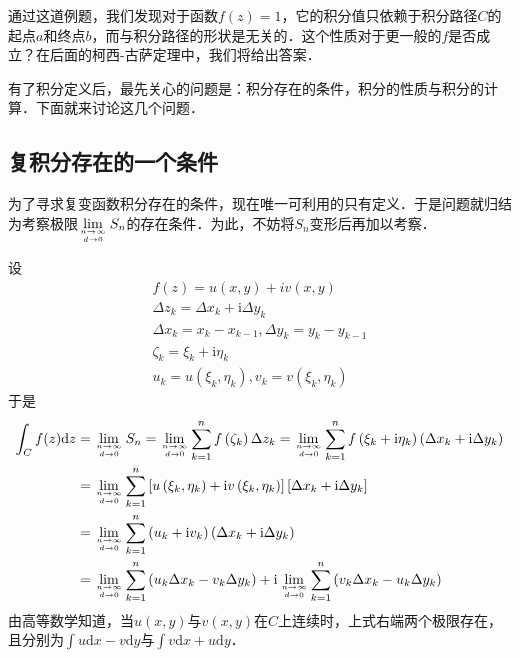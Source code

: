 通过这道例题，我们发现对于函数$f(z)=1$，它的积分值只依赖于积分路径$C$的起点$a$和终点$b$，而与积分路径的形状是无关的．这个性质对于更一般的$f$是否成立？在后面的柯西-古萨定理中，我们将给出答案．

有了积分定义后，最先关心的问题是：积分存在的条件，积分的性质与积分的计算．下面就来讨论这几个问题．

\subsection{复积分存在的一个条件}

为了寻求复变函数积分存在的条件，现在唯一可利用的只有定义．于是问题就归结为考察极限$\displaystyle \lim _{n \rightarrow \infty \atop d \rightarrow 0} S_{n}$的存在条件．为此，不妨将$S_n$变形后再加以考察．

设
\begin{equation}
\begin{array}{l}f(z)=u(x, y)+i v(x, y) \\ \Delta z_{k}=\Delta x_{k}+\mathrm{i} \Delta y_{k} \\ \Delta x_{k}=x_{k}-x_{k-1}, \Delta y_{k}=y_{k}-y_{k-1} \\ \zeta_{k}=\xi_{k}+\mathrm{i} \eta_{k} \\ u_{k}=u\left(\xi_{k}, \eta_{k}\right), v_{k}=v\left(\xi_{k}, \eta_{k}\right)\end{array}
\end{equation}
于是
\begin{equation}
\begin{aligned} \int_{C} f(z) \mathrm{d} z &=\lim _{n \rightarrow \infty \atop d \rightarrow 0} S_{n}=\lim _{n \rightarrow \infty \atop d \rightarrow 0} \sum_{k=1}^{n} f\left(\zeta_{k}\right) \Delta z_{k}=\lim _{n \rightarrow \infty \atop d \rightarrow 0} \sum_{k=1}^{n} f\left(\xi_{k}+\mathrm{i} \eta_{k}\right)\left(\Delta x_{k}+\mathrm{i} \Delta y_{k}\right) \\ &=\lim _{n \rightarrow \infty \atop d \rightarrow 0} \sum_{k=1}^{n}\left[u\left(\xi_{k}, \eta_{k}\right)+\mathrm{i} v\left(\xi_{k}, \eta_{k}\right)\right]\left[\Delta x_{k}+\mathrm{i} \Delta y_{k}\right] \\ &=\lim _{n \rightarrow \infty \atop d \rightarrow 0} \sum_{k=1}^{n}\left(u_{k}+\mathrm{i} v_{k}\right)\left(\Delta x_{k}+\mathrm{i} \Delta y_{k}\right) \\ &=\lim _{n \rightarrow \infty \atop d \rightarrow 0} \sum_{k=1}^{n}\left(u_{k} \Delta x_{k}-v_{k} \Delta y_{k}\right)+\mathrm{i} \lim _{n \rightarrow \infty \atop d \rightarrow 0} \sum_{k=1}^{n}\left(v_{k} \Delta x_{k}-u_{k} \Delta y_{k}\right) \end{aligned}
\end{equation}
由高等数学知道，当$u(x, y)$与$v(x, y)$在$C$上连续时，上式右端两个极限存在，且分别为$\displaystyle \int u \mathrm{d} x-v \mathrm{d} y $与$\displaystyle \int v \mathrm{d} x+u \mathrm{d} y$．

